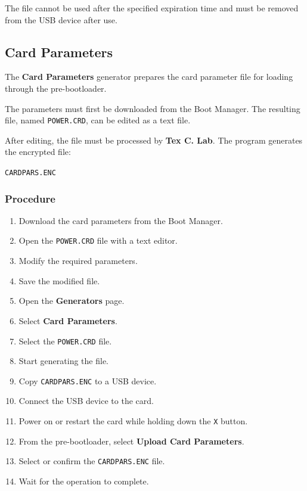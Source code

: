 ﻿\documentclass[11pt,a4paper]{article}
\newcommand{\software}{\textbf{Tex C. Lab}}
\newcommand{\button}[1]{\textbf{#1}}
\newcommand{\filename}[1]{\texttt{#1}}
\begin{document}
The file cannot be used after the specified expiration time
and must be removed from the USB device after use.

\subsection{Card Parameters}

The \button{Card Parameters} generator prepares the card parameter
file for loading through the pre-bootloader.

The parameters must first be downloaded from the Boot Manager.
The resulting file, named \filename{POWER.CRD}, can be edited
as a text file.

After editing, the file must be processed by \software{}.
The program generates the encrypted file:

\begin{center}
    \filename{CARDPARS.ENC}
\end{center}

\subsubsection*{Procedure}

\begin{enumerate}
    \item Download the card parameters from the Boot Manager.
    \item Open the \filename{POWER.CRD} file with a text editor.
    \item Modify the required parameters.
    \item Save the modified file.
    \item Open the \button{Generators} page.
    \item Select \button{Card Parameters}.
    \item Select the \filename{POWER.CRD} file.
    \item Start generating the file.
    \item Copy \filename{CARDPARS.ENC} to a USB device.
    \item Connect the USB device to the card.
    \item Power on or restart the card while holding down
    the \texttt{X} button.
    \item From the pre-bootloader, select
    \button{Upload Card Parameters}.
    \item Select or confirm the \filename{CARDPARS.ENC} file.
    \item Wait for the operation to complete.
\end{enumerate}
\end{document}
